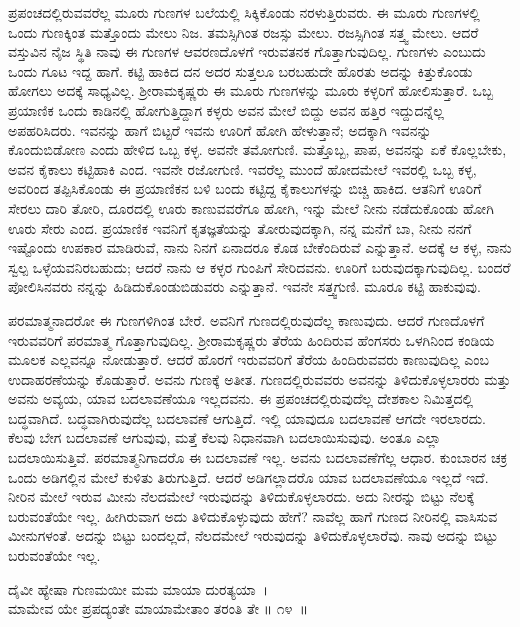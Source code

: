 ಪ್ರಪಂಚದಲ್ಲಿರುವವರೆಲ್ಲ ಮೂರು ಗುಣಗಳ ಬಲೆಯಲ್ಲಿ ಸಿಕ್ಕಿಕೊಂಡು ನರಳುತ್ತಿರುವರು. ಈ ಮೂರು ಗುಣಗಳಲ್ಲಿ ಒಂದು ಗುಣಕ್ಕಿಂತ ಮತ್ತೊಂದು ಮೇಲು ನಿಜ. ತಮಸ್ಸಿಗಿಂತ ರಜಸ್ಸು ಮೇಲು. ರಜಸ್ಸಿಗಿಂತ ಸತ್ತ್ವ ಮೇಲು. ಆದರೆ ವಸ್ತುವಿನ ನೈಜ ಸ್ಥಿತಿ ನಾವು ಈ ಗುಣಗಳ ಆವರಣದೊಳಗೆ ಇರುವತನಕ ಗೊತ್ತಾಗುವುದಿಲ್ಲ. ಗುಣಗಳು ಎಂಬುದು ಒಂದು ಗೂಟ ಇದ್ದ ಹಾಗೆ. ಕಟ್ಟಿ ಹಾಕಿದ ದನ ಅದರ ಸುತ್ತಲೂ ಬರಬಹುದೇ ಹೊರತು ಅದನ್ನು ಕಿತ್ತುಕೊಂಡು ಹೋಗಲು ಅದಕ್ಕೆ ಸಾಧ್ಯವಿಲ್ಲ. ಶ‍್ರೀರಾಮಕೃಷ್ಣರು ಈ ಮೂರು ಗುಣಗಳನ್ನು ಮೂರು ಕಳ್ಳರಿಗೆ ಹೋಲಿಸುತ್ತಾರೆ. ಒಬ್ಬ ಪ್ರಯಾಣಿಕ ಒಂದು ಕಾಡಿನಲ್ಲಿ ಹೋಗುತ್ತಿದ್ದಾಗ ಕಳ್ಳರು ಅವನ ಮೇಲೆ ಬಿದ್ದು ಅವನ ಹತ್ತಿರ ಇದ್ದುದನ್ನೆಲ್ಲ ಅಪಹರಿಸಿದರು. ಇವನನ್ನು ಹಾಗೆ ಬಿಟ್ಟರೆ ಇವನು ಊರಿಗೆ ಹೋಗಿ ಹೇಳುತ್ತಾನೆ; ಅದಕ್ಕಾಗಿ ಇವನನ್ನು ಕೊಂದುಬಿಡೋಣ ಎಂದು ಹೇಳಿದ ಒಬ್ಬ ಕಳ್ಳ. ಅವನೇ ತಮೋಗುಣಿ. ಮತ್ತೊಬ್ಬ, ಪಾಪ, ಅವನನ್ನು ಏಕೆ ಕೊಲ್ಲಬೇಕು, ಅವನ ಕೈಕಾಲು ಕಟ್ಟಿಹಾಕಿ ಎಂದ. ಇವನೇ ರಜೋಗುಣಿ. ಇವರೆಲ್ಲ ಮುಂದೆ ಹೋದಮೇಲೆ ಇವರಲ್ಲಿ ಒಬ್ಬ ಕಳ್ಳ, ಅವರಿಂದ ತಪ್ಪಿಸಿಕೊಂಡು ಈ ಪ್ರಯಾಣಿಕನ ಬಳಿ ಬಂದು ಕಟ್ಟಿದ್ದ ಕೈಕಾಲುಗಳನ್ನು ಬಿಚ್ಚಿ ಹಾಕಿದ. ಆತನಿಗೆ ಊರಿಗೆ ಸೇರಲು ದಾರಿ ತೋರಿ, ದೂರದಲ್ಲಿ ಊರು ಕಾಣುವವರೆಗೂ ಹೋಗಿ, ಇನ್ನು ಮೇಲೆ ನೀನು ನಡೆದುಕೊಂಡು ಹೋಗಿ ಊರು ಸೇರು ಎಂದ. ಪ್ರಯಾಣಿಕ ಇವನಿಗೆ ಕೃತಜ್ಞತೆಯನ್ನು ತೋರುವುದಕ್ಕಾಗಿ, ನನ್ನ ಮನೆಗೆ ಬಾ, ನೀನು ನನಗೆ ಇಷ್ಟೊಂದು ಉಪಕಾರ ಮಾಡಿರುವೆ, ನಾನು ನಿನಗೆ ಏನಾದರೂ ಕೊಡ ಬೇಕೆಂದಿರುವೆ ಎನ್ನುತ್ತಾನೆ. ಅದಕ್ಕೆ ಆ ಕಳ್ಳ, ನಾನು ಸ್ವಲ್ಪ ಒಳ್ಳೆಯವನಿರಬಹುದು; ಆದರೆ ನಾನು ಆ ಕಳ್ಳರ ಗುಂಪಿಗೆ ಸೇರಿದವನು. ಊರಿಗೆ ಬರುವುದಕ್ಕಾಗುವುದಿಲ್ಲ. ಬಂದರೆ ಪೋಲಿಸಿನವರು ನನ್ನನ್ನು ಹಿಡಿದುಕೊಂಡುಬಿಡುವರು ಎನ್ನುತ್ತಾನೆ. ಇವನೇ ಸತ್ತ್ವಗುಣಿ. ಮೂರೂ ಕಟ್ಟಿ ಹಾಕುವುವು.

ಪರಮಾತ್ಮನಾದರೋ ಈ ಗುಣಗಳಿಗಿಂತ ಬೇರೆ. ಅವನಿಗೆ ಗುಣದಲ್ಲಿರುವುದೆಲ್ಲ ಕಾಣುವುದು. ಆದರೆ ಗುಣದೊಳಗೆ ಇರುವವರಿಗೆ ಪರಮಾತ್ಮ ಗೊತ್ತಾಗುವುದಿಲ್ಲ. ಶ‍್ರೀರಾಮಕೃಷ್ಣರು ತೆರೆಯ ಹಿಂದಿರುವ ಹೆಂಗಸರು ಒಳಗಿನಿಂದ ಕಂಡಿಯ ಮೂಲಕ ಎಲ್ಲವನ್ನೂ ನೋಡುತ್ತಾರೆ. ಆದರೆ ಹೊರಗೆ ಇರುವವರಿಗೆ ತೆರೆಯ ಹಿಂದಿರುವವರು ಕಾಣುವುದಿಲ್ಲ ಎಂಬ ಉದಾಹರಣೆಯನ್ನು ಕೊಡುತ್ತಾರೆ. ಅವನು ಗುಣಕ್ಕೆ ಅತೀತ. ಗುಣದಲ್ಲಿರುವವರು ಅವನನ್ನು ತಿಳಿದುಕೊಳ್ಳಲಾರರು ಮತ್ತು ಅವನು ಅವ್ಯಯ, ಯಾವ ಬದಲಾವಣೆಯೂ ಇಲ್ಲದವನು. ಈ ಪ್ರಪಂಚದಲ್ಲಿರುವುದೆಲ್ಲ ದೇಶಕಾಲ ನಿಮಿತ್ತದಲ್ಲಿ ಬದ್ಧವಾಗಿದೆ. ಬದ್ಧವಾಗಿರುವುದೆಲ್ಲ ಬದಲಾವಣೆ ಆಗುತ್ತಿದೆ. ಇಲ್ಲಿ ಯಾವುದೂ ಬದಲಾವಣೆ ಆಗದೇ ಇರಲಾರದು. ಕೆಲವು ಬೇಗ ಬದಲಾವಣೆ ಆಗುವುವು, ಮತ್ತೆ ಕೆಲವು ನಿಧಾನವಾಗಿ ಬದಲಾಯಿಸುವುವು. ಅಂತೂ ಎಲ್ಲಾ ಬದಲಾಯಿಸುತ್ತಿವೆ. ಪರಮಾತ್ಮನಿಗಾ\-ದರೊ ಈ ಬದಲಾವಣೆ ಇಲ್ಲ. ಅವನು ಬದಲಾವಣೆಗೆಲ್ಲ ಆಧಾರ. ಕುಂಬಾರನ ಚಕ್ರ ಒಂದು ಅಡಿಗಲ್ಲಿನ ಮೇಲೆ ಕುಳಿತು ತಿರುಗುತ್ತಿದೆ. ಆದರೆ ಅಡಿಗಲ್ಲಾದರೊ ಯಾವ ಬದಲಾವಣೆಯೂ ಇಲ್ಲದೆ ಇದೆ. ನೀರಿನ ಮೇಲೆ ಇರುವ ಮೀನು ನೆಲದಮೇಲೆ ಇರುವುದನ್ನು ತಿಳಿದುಕೊಳ್ಳಲಾರದು. ಅದು ನೀರನ್ನು ಬಿಟ್ಟು ನೆಲಕ್ಕೆ ಬರುವಂತೆಯೇ ಇಲ್ಲ. ಹೀಗಿರುವಾಗ ಅದು ತಿಳಿದುಕೊಳ್ಳುವುದು ಹೇಗೆ? ನಾವೆಲ್ಲ ಹಾಗೆ ಗುಣದ ನೀರಿನಲ್ಲಿ ವಾಸಿಸುವ ಮೀನುಗಳಂತೆ. ಅದನ್ನು ಬಿಟ್ಟು ಬಂದಲ್ಲದೆ, ನೆಲದಮೇಲೆ ಇರುವುದನ್ನು ತಿಳಿದುಕೊಳ್ಳಲಾರೆವು. ನಾವು ಅದನ್ನು ಬಿಟ್ಟು ಬರುವಂತೆಯೇ ಇಲ್ಲ.

\begin{shloka}
ದೈವೀ ಹ್ಯೇಷಾ ಗುಣಮಯೀ ಮಮ ಮಾಯಾ ದುರತ್ಯಯಾ~।\\ಮಾಮೇವ ಯೇ ಪ್ರಪದ್ಯಂತೇ ಮಾಯಾಮೇತಾಂ ತರಂತಿ ತೇ \hfill॥ ೧೪~॥
\end{shloka}

